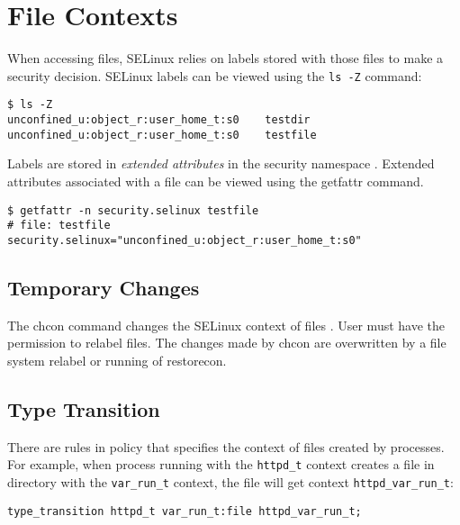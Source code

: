 
\section{File Contexts}
\label{filecontexts}

When accessing files, SELinux relies on labels stored with those files to make a
security decision. SELinux labels can be viewed using the \texttt{ls -Z}
command:
\begin{lstlisting}
$ ls -Z
unconfined_u:object_r:user_home_t:s0    testdir
unconfined_u:object_r:user_home_t:s0    testfile
\end{lstlisting}
Labels are stored in \emph{extended attributes} in the security namespace
\cite{xattrman}. Extended attributes associated with a file can be viewed using
the getfattr command.
\begin{lstlisting}
$ getfattr -n security.selinux testfile
# file: testfile
security.selinux="unconfined_u:object_r:user_home_t:s0"
\end{lstlisting}

\subsection{Temporary Changes}
The chcon command changes the SELinux context of files \cite{selinuxguide}. User
must have the permission to relabel files. The changes made by chcon are
overwritten by a file system relabel or running of restorecon.

\subsection{Type Transition}
There are rules in policy that specifies the context of files created by
processes. For example, when process running with the \texttt{httpd\_t} context
creates a file in directory with the \texttt{var\_run\_t} context, the file will
get context \texttt{httpd\_var\_run\_t}:
\begin{lstlisting}[language=te]
type_transition httpd_t var_run_t:file httpd_var_run_t;
\end{lstlisting}


